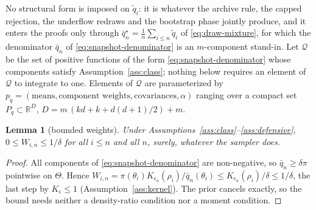 \documentclass[pdflatex,sn-mathphys-num]{sn-jnl}
\theoremstyle{plain}
\newtheorem{lemma}[theorem]{Lemma}
\theoremstyle{definition}
\begin{document}
\begin{appendices}
No structural form is imposed on $\tilde q_i$: it is whatever the archive rule, the capped rejection, the underflow redraws and the bootstrap phase jointly produce, and it enters the proofs only through $\bar q^\star_n=\tfrac1n\sum_{i\le n}\tilde q_i$ of \eqref{eq:draw-mixture}, for which the denominator $\bar q_n$ of \eqref{eq:snapshot-denominator} is an $m$-component stand-in. Let $\mathcal{Q}$ be the set of positive functions of the form \eqref{eq:snapshot-denominator} whose components satisfy Assumption~\ref{ass:class}; nothing below requires an element of $\mathcal{Q}$ to integrate to one. Elements of $\mathcal{Q}$ are parameterized by $p_q=(\text{means},\text{component weights},\text{covariances},\alpha)$ ranging over a compact set $P_q\subset\mathbb{R}^{D}$, $D=m\,(kd+k+d(d+1)/2)+m$.

\begin{lemma}[bounded weights]\label{lem:bounded}
Under Assumptions~\ref{ass:class}--\ref{ass:defensive}, $0\le W_{i,n}\le1/\delta$ for all $i\le n$ and all $n$, surely, whatever the sampler does.
\end{lemma}
\begin{proof}
All components of \eqref{eq:snapshot-denominator} are non-negative, so $\bar q_n\ge\delta\pi$ pointwise on $\Theta$. Hence $W_{i,n}=\pi(\theta_i)K_{\epsilon_n}(\rho_i)/\bar q_n(\theta_i)\le K_{\epsilon_n}(\rho_i)/\delta\le1/\delta$, the last step by $K_\epsilon\le1$ (Assumption~\ref{ass:kernel}). The prior cancels exactly, so the bound needs neither a density-ratio condition nor a moment condition.
\end{proof}


\end{appendices}
\end{document}
